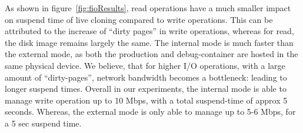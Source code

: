 As shown in figure~\ref{fig:fioResults}, read operations have a much smaller impact on suspend time of live cloning compared to write operations.
This can be attributed to the increase of ``dirty pages'' in write operations, whereas for read, the disk image remains largely the same.
The internal mode is much faster than the external mode, as both the production and debug-container are hosted in the same physical device.
We believe, that for higher I/O operations, with a large amount of ``dirty-pages'', network bandwidth becomes a bottleneck: leading to longer suspend times.
Overall in our experiments, the internal mode is able to manage write operation up to 10 Mbps, with a total suspend-time of approx 5 seconds.
Whereas, the external mode is only able to manage up to 5-6 Mbps, for a 5 sec suspend time.\\ \\
